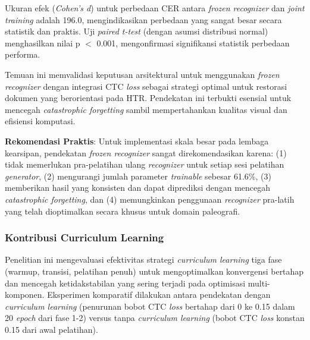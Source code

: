 \documentclass[12pt,a4paper]{article}
\begin{document}
\vspace{0.8em}

Ukuran efek (\textit{Cohen's d}) untuk perbedaan CER antara \textit{frozen recognizer} dan \textit{joint training} adalah 196.0, mengindikasikan perbedaan yang sangat besar secara statistik dan praktis. Uji \textit{paired t-test} (dengan asumsi distribusi normal) menghasilkan nilai p $<$ 0.001, mengonfirmasi signifikansi statistik perbedaan performa.

Temuan ini memvalidasi keputusan arsitektural untuk menggunakan \textit{frozen recognizer} dengan integrasi CTC \textit{loss} sebagai strategi optimal untuk restorasi dokumen yang berorientasi pada HTR. Pendekatan ini terbukti esensial untuk mencegah \textit{catastrophic forgetting} sambil mempertahankan kualitas visual dan efisiensi komputasi.

\textbf{Rekomendasi Praktis}: Untuk implementasi skala besar pada lembaga kearsipan, pendekatan \textit{frozen recognizer} sangat direkomendasikan karena: (1) tidak memerlukan pra-pelatihan ulang \textit{recognizer} untuk setiap sesi pelatihan \textit{generator}, (2) mengurangi jumlah parameter \textit{trainable} sebesar 61.6\%, (3) memberikan hasil yang konsisten dan dapat diprediksi dengan mencegah \textit{catastrophic forgetting}, dan (4) memungkinkan penggunaan \textit{recognizer} pra-latih yang telah dioptimalkan secara khusus untuk domain paleografi.

\vspace{0.8em}

\subsubsection{Kontribusi Curriculum Learning}
\label{subsubsec:kontribusi-curriculum-learning}

Penelitian ini mengevaluasi efektivitas strategi \textit{curriculum learning} tiga fase (warmup, transisi, pelatihan penuh) untuk mengoptimalkan konvergensi bertahap dan mencegah ketidakstabilan yang sering terjadi pada optimisasi multi-komponen. Eksperimen komparatif dilakukan antara pendekatan dengan \textit{curriculum learning} (penurunan bobot CTC \textit{loss} bertahap dari 0 ke 0.15 dalam 20 \textit{epoch} dari fase 1-2) versus tanpa \textit{curriculum learning} (bobot CTC \textit{loss} konstan 0.15 dari awal pelatihan).
\end{document}
